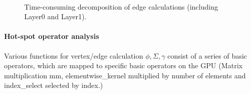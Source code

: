 \begin{figure}
	\centering
    \\
    \caption{Time-consuming decomposition of edge calculations (including Layer0 and Layer1).}
	\label{fig:exp_edge_calc_decomposition}
\end{figure}

\paragraph{Hot-spot operator analysis}
Various functions for vertex/edge calculation $\phi, \Sigma,\gamma$ consist of a series of basic operators,
which are mapped to specific basic operators on the GPU (Matrix multiplication mm, elementwise\_kernel multiplied by number of elements and index\_select selected by index.)

